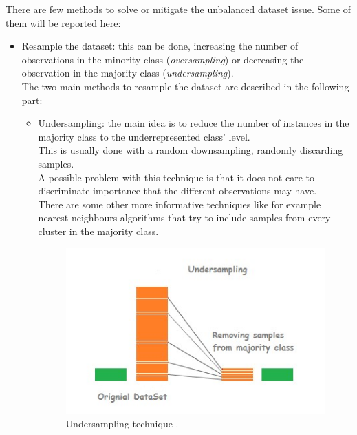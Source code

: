 There are few methods to solve or mitigate the unbalanced dataset issue. Some of them will be reported here:
\begin{itemize}
    \item Resample the dataset: this can be done, increasing the number of observations in the minority class (\emph{oversampling}) or decreasing the observation in the majority class (\emph{undersampling}). \\
    The two main methods to resample the dataset are described in the following part:
        \begin{itemize}
            \item Undersampling: the main idea is to reduce the number of instances in the majority class to the underrepresented class' level. \\
            This is usually done with a random downsampling, randomly discarding samples.\\
            
            A possible problem with this technique is that it does not care to discriminate importance that the different observations may have.\\
            
            There are some other more informative techniques like for example nearest neighbours algorithms that try to include samples from every cluster in the majority class.
            \begin{figure}[H]
                \centering                \includegraphics[width=0.55\linewidth]{images/Background/Unbalanced/Undersampling.jpg}
                \caption[Undersampling technique]{Undersampling technique \cite{unbalanced}.}
            \end{figure}
            

\end{itemize}
\end{itemize}
